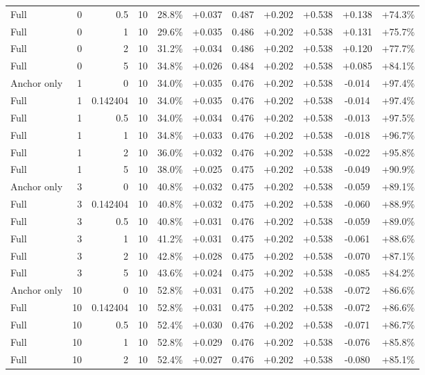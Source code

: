 \begin{table}[htbp]
\begin{tabular}{lrrrccccccc}
Full & 0 & 0.5 & 10 & 28.8\% & +0.037 & 0.487 & +0.202 & +0.538 & +0.138 & +74.3\% \\
Full & 0 & 1 & 10 & 29.6\% & +0.035 & 0.486 & +0.202 & +0.538 & +0.131 & +75.7\% \\
Full & 0 & 2 & 10 & 31.2\% & +0.034 & 0.486 & +0.202 & +0.538 & +0.120 & +77.7\% \\
Full & 0 & 5 & 10 & 34.8\% & +0.026 & 0.484 & +0.202 & +0.538 & +0.085 & +84.1\% \\
Anchor only & 1 & 0 & 10 & 34.0\% & +0.035 & 0.476 & +0.202 & +0.538 & -0.014 & +97.4\% \\
Full & 1 & 0.142404 & 10 & 34.0\% & +0.035 & 0.476 & +0.202 & +0.538 & -0.014 & +97.4\% \\
Full & 1 & 0.5 & 10 & 34.0\% & +0.034 & 0.476 & +0.202 & +0.538 & -0.013 & +97.5\% \\
Full & 1 & 1 & 10 & 34.8\% & +0.033 & 0.476 & +0.202 & +0.538 & -0.018 & +96.7\% \\
Full & 1 & 2 & 10 & 36.0\% & +0.032 & 0.476 & +0.202 & +0.538 & -0.022 & +95.8\% \\
Full & 1 & 5 & 10 & 38.0\% & +0.025 & 0.475 & +0.202 & +0.538 & -0.049 & +90.9\% \\
Anchor only & 3 & 0 & 10 & 40.8\% & +0.032 & 0.475 & +0.202 & +0.538 & -0.059 & +89.1\% \\
Full & 3 & 0.142404 & 10 & 40.8\% & +0.032 & 0.475 & +0.202 & +0.538 & -0.060 & +88.9\% \\
Full & 3 & 0.5 & 10 & 40.8\% & +0.031 & 0.476 & +0.202 & +0.538 & -0.059 & +89.0\% \\
Full & 3 & 1 & 10 & 41.2\% & +0.031 & 0.475 & +0.202 & +0.538 & -0.061 & +88.6\% \\
Full & 3 & 2 & 10 & 42.8\% & +0.028 & 0.475 & +0.202 & +0.538 & -0.070 & +87.1\% \\
Full & 3 & 5 & 10 & 43.6\% & +0.024 & 0.475 & +0.202 & +0.538 & -0.085 & +84.2\% \\
Anchor only & 10 & 0 & 10 & 52.8\% & +0.031 & 0.475 & +0.202 & +0.538 & -0.072 & +86.6\% \\
Full & 10 & 0.142404 & 10 & 52.8\% & +0.031 & 0.475 & +0.202 & +0.538 & -0.072 & +86.6\% \\
Full & 10 & 0.5 & 10 & 52.4\% & +0.030 & 0.476 & +0.202 & +0.538 & -0.071 & +86.7\% \\
Full & 10 & 1 & 10 & 52.8\% & +0.029 & 0.476 & +0.202 & +0.538 & -0.076 & +85.8\% \\
Full & 10 & 2 & 10 & 52.4\% & +0.027 & 0.476 & +0.202 & +0.538 & -0.080 & +85.1\% \\

\end{tabular}
\end{table}
